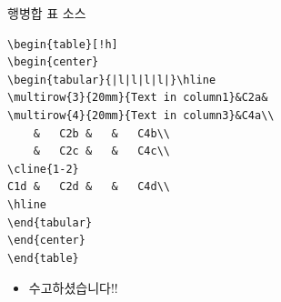\documentclass{beamer}
\begin{document}
\begin{frame}[fragile]
\begin{block}{행병합 표 소스}
\begin{center}
\begin{verbatim}
\begin{table}[!h]
\begin{center}
\begin{tabular}{|l|l|l|l|}\hline
\multirow{3}{20mm}{Text in column1}&C2a&
\multirow{4}{20mm}{Text in column3}&C4a\\
	&	C2b	&	&	C4b\\
	&	C2c	&	&	C4c\\
\cline{1-2}
C1d	&	C2d	&	&	C4d\\
\hline
\end{tabular}
\end{center}
\end{table}
\end{verbatim}
\end{center}
\end{block}
\end{frame}


\begin{frame}

\begin{itemize}
\item[] 
\begin{center}
수고하셨습니다!!
\end{center}
\end{itemize}


\end{frame}
\end{document}
